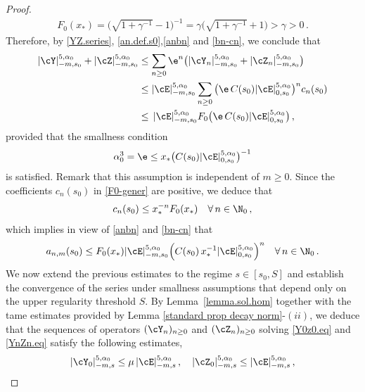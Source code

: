 \documentclass[a4paper,reqno,10pt]{article}
\begin{document}
\begin{proof}
	\begin{align}\label{F0xstar}
    F_0(x_*)=\big( \sqrt{1+\gamma^{-1}} -1 \big)^{-1} = \gamma \big( \sqrt{1+\gamma^{-1}} +1 \big)> \gamma >0\,.
    \end{align} 
	Therefore, by \eqref{YZ.series}, \eqref{an.def.s0},\eqref{anbn} and \eqref{bn-cn}, we conclude that
	\begin{align}
		|\cY|_{-m,s_0}^{5,\alpha_{0}} + |\cZ|_{-m,s_0}^{5,\alpha_{0}} &\leq \sum_{n\geq 0}  \e^n \big( |\cY_{n}|_{-m,s_0}^{5,\alpha_{0}} + |\cZ_{n}|_{-m,s_0}^{5,\alpha_{0}}  \big) \\
        &\leq |\cE|_{-m,s_0}^{5,\alpha_{0}}\sum_{n\geq 0}   \big( \e\, C(s_0) |\cE|_{0,s_0}^{5,\alpha_{0}} \big)^{n} c_{n}(s_0) \\
		\label{lownorm.est}& \leq\, |\cE|_{-m,s_0}^{5,\alpha_{0}} F_0\big( \e\, C(s_0) |\cE|_{0,s_0}^{5,\alpha_{0}} \big) \,,
	\end{align}
	provided that the smallness condition \begin{align}\label{smalln-ep}{}\alpha_{0}^3 = \e \leq x_* \big({C(s_0)}|\cE|_{0,s_0}^{5,\alpha_{0}} \big)^{-1}
    \end{align}
    is satisfied. Remark that this assumption is   independent of $m\geq 0$.
     Since the coefficients $c_{n}(s_0)$ in \eqref{F0-gener} are positive, we deduce that
	 \begin{equation}
	 	c_{n}(s_0) \leq x_*^{-n} F_0(x_*)  \quad  \forall\, n\in \N_{0}  \,,
	 \end{equation}
	 which implies in view of  \eqref{anbn}  and \eqref{bn-cn} that
	 \begin{align}\label{anm-est}
	 	a_{n,m}(s_0) \leq  F_0(x_*) |\cE|_{-m,s_0}^{5,\alpha_{0}} \Big( {C(s_0)}\,x_*^{-1} |\cE|_{0,s_0}^{5,\alpha_{0}} \Big)^n \quad \forall \, n\in\N_{0} \,.
	 \end{align}
    We now extend the previous estimates to the regime $s\in[s_0,S]$ and establish the convergence of the series under smallness assumptions that depend only on the upper  regularity threshold  $S$. By Lemma~\ref{lemma.sol.hom} together with  the tame estimates provided by  Lemma \ref{standard prop decay norm}-$(ii)$, we deduce  that the sequences of operators $(\cY_{n})_{n\geq 0}$ and $(\cZ_{n})_{n\geq 0}$ solving \eqref{Y0z0.eq} and \eqref{YnZn.eq} satisfy the following estimates,
	 	\begin{align}
		 		|\cY_{0}|_{-m,s}^{5,\alpha_{0}} \leq \mu\, |\cE|_{-m,s}^{5,\alpha_{0}} \,, \quad 	|\cZ_{0}|_{-m,s}^{5,\alpha_{0}} \leq  |\cE|_{-m,s}^{5,\alpha_{0}} \,, \label{high.Y0Z0}

\end{align}
\end{proof}
\end{document}
